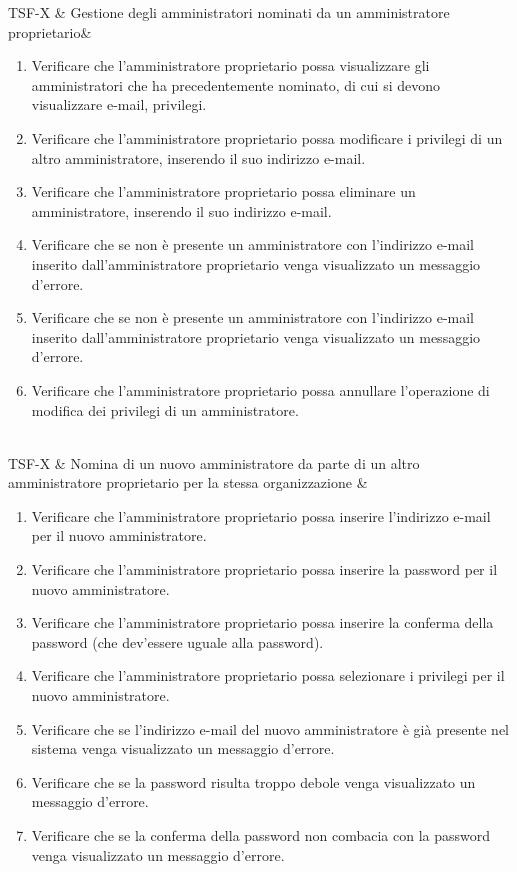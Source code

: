 TSF-X & Gestione degli amministratori nominati da un amministratore proprietario& \begin{enumerate}
    \item Verificare che l'amministratore proprietario possa visualizzare gli amministratori che ha precedentemente nominato, di cui si devono visualizzare e-mail, privilegi.
    \item Verificare che l'amministratore proprietario possa modificare i privilegi di un altro amministratore, inserendo il suo indirizzo e-mail.
    \item Verificare che l'amministratore proprietario possa eliminare un amministratore, inserendo il suo indirizzo e-mail.
    \item Verificare che se non è presente un amministratore con l'indirizzo e-mail inserito dall'amministratore proprietario venga visualizzato un messaggio d'errore.
    \item Verificare che se non è presente un amministratore con l'indirizzo e-mail inserito dall'amministratore proprietario venga visualizzato un messaggio d'errore.
    \item Verificare che l'amministratore proprietario possa annullare l'operazione di modifica dei privilegi di un amministratore.
\end{enumerate} \\

TSF-X & Nomina di un nuovo amministratore da parte di un altro amministratore proprietario per la stessa organizzazione & \begin{enumerate}
    \item Verificare che l'amministratore proprietario possa inserire l'indirizzo e-mail per il nuovo amministratore.
    \item Verificare che l'amministratore proprietario possa inserire la password per il nuovo amministratore.
    \item Verificare che l'amministratore proprietario possa inserire la conferma della password (che dev'essere uguale alla password).
    \item Verificare che l'amministratore proprietario possa selezionare i privilegi per il nuovo amministratore.
    \item Verificare che se l'indirizzo e-mail del nuovo amministratore è già presente nel sistema venga visualizzato un messaggio d'errore.
    \item Verificare che se la password risulta troppo debole venga visualizzato un messaggio d'errore.
    \item Verificare che se la conferma della password non combacia con la password venga visualizzato un messaggio d'errore.
\end{enumerate} \\
